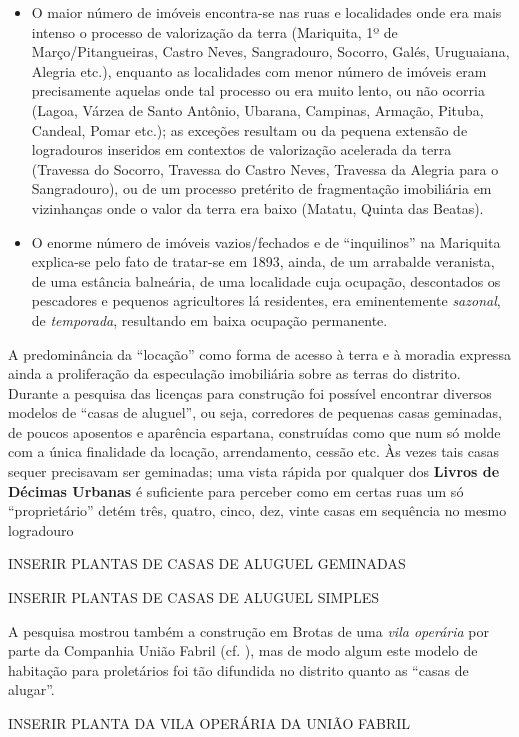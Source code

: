 \begin{itemize}
\item O maior número de imóveis encontra-se nas ruas e localidades onde era mais intenso o processo de valorização da terra (Mariquita, 1º de Março/Pitangueiras, Castro Neves, Sangradouro, Socorro, Galés, Uruguaiana, Alegria etc.), enquanto as localidades com menor número de imóveis eram precisamente aquelas onde tal processo ou era muito lento, ou não ocorria (Lagoa, Várzea de Santo Antônio, Ubarana, Campinas, Armação, Pituba, Candeal, Pomar etc.); as exceções resultam ou da pequena extensão de logradouros inseridos em contextos de valorização acelerada da terra (Travessa do Socorro, Travessa do Castro Neves, Travessa da Alegria para o Sangradouro), ou de um processo pretérito de fragmentação imobiliária em vizinhanças onde o valor da terra era baixo (Matatu, Quinta das Beatas).
\item O enorme número de imóveis vazios/fechados e de ``inquilinos'' na Mariquita explica-se pelo fato de tratar-se em 1893, ainda, de um arrabalde veranista, de uma estância balneária, de uma localidade cuja ocupação, descontados os pescadores e pequenos agricultores lá residentes, era eminentemente \textit{sazonal}, de \textit{temporada}, resultando em baixa ocupação permanente.
\end{itemize}

A predominância da ``locação'' como forma de acesso à terra e à moradia expressa ainda a proliferação da especulação imobiliária sobre as terras do distrito. Durante a pesquisa das licenças para construção foi possível encontrar diversos modelos de ``casas de aluguel'', ou seja, corredores de pequenas casas geminadas, de poucos aposentos e aparência espartana, construídas como que num só molde com a única finalidade da locação, arrendamento, cessão etc. Às vezes tais casas sequer precisavam ser geminadas; uma vista rápida por qualquer dos \textbf{Livros de Décimas Urbanas} é suficiente para perceber como em certas ruas um só ``proprietário'' detém três, quatro, cinco, dez, vinte casas em sequência no mesmo logradouro

INSERIR PLANTAS DE CASAS DE ALUGUEL GEMINADAS

INSERIR PLANTAS DE CASAS DE ALUGUEL SIMPLES

A pesquisa mostrou também a construção em Brotas de uma \textit{vila operária} por parte da Companhia União Fabril (cf. ), mas de modo algum este modelo de habitação para proletários foi tão difundida no distrito quanto as ``casas de alugar''.

INSERIR PLANTA DA VILA OPERÁRIA DA UNIÃO FABRIL


